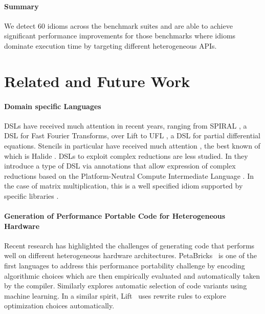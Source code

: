 {\paragraph{Summary}
We detect 60 idioms across the benchmark suites and are able to achieve significant performance improvements for those benchmarks where idioms dominate execution time by targeting different heterogeneous APIs.

\section{Related and Future Work}

\paragraph{Domain specific Languages}
DSLs have received much attention in recent years, ranging from SPIRAL \cite{ofenbeck13spiral},
a DSL for Fast Fourier Transforms, over Lift \cite{steuwer15rewrite, SteuwerRD17,HagedornSSGD18} to
UFL \cite{Alnaes:2014:UFL:2594412.2566630}, a DSL for partial
differential equations.  Stencils in particular have received much
attention \cite{Mullapudi:2015:PAO:2694344.2694364,HagedornSSGD18}, the best known of which is Halide
\cite{Ragan-Kelley2013Halide}. DSLs to exploit complex reductions are
less studied. In \cite{Reddy2016Reduction} they introduce a type of DSL via 
 annotations
that allow expression of complex reductions based on the
Platform-Neutral Compute Intermediate Language
\cite{baghdadi2015PENCIL}. In the case of matrix multiplication,
this is a well specified idiom supported by specific libraries
\cite{clBlas-1,mkl-1,cuBLAS-1}.

\paragraph{Generation of Performance Portable Code for Heterogeneous Hardware}
Recent research has highlighted the challenges of generating code that performs well on different heterogeneous hardware architectures.
PetaBricks~\cite{PhothilimthanaARA13} is one of the first languages to address this performance portability challenge by encoding algorithmic choices which are then empirically evaluated and automatically taken by the compiler.
Similarly \cite{MuralidharanRHG16} explores automatic selection of code variants using machine learning.
In a similar spirit, Lift~\cite{steuwer15rewrite} uses rewrite rules to explore optimization choices automatically.

}

